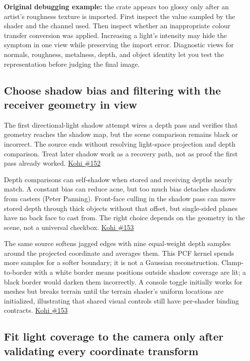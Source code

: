 \textbf{Original debugging example:} the crate appears too glossy only after an artist's roughness texture is imported. First inspect the value sampled by the shader and the channel used. Then inspect whether an inappropriate colour transfer conversion was applied. Increasing a light's intensity may hide the symptom in one view while preserving the import error. Diagnostic views for normals, roughness, metalness, depth, and object identity let you test the representation before judging the final image.

\subsection{Choose shadow bias and filtering with the receiver geometry in view}\label{06-engine-ii-ch026-choose-shadow-bias-and-filtering-with-the-receiver-geometry-in-view}

The first directional-light shadow attempt wires a depth pass and verifies that geometry reaches the shadow map, but the scene comparison remains black or incorrect. The source ends without resolving light-space projection and depth comparison. Treat later shadow work as a recovery path, not as proof the first pass already worked. \href{https://www.youtube.com/watch?v=2IxH8C9OUzg}{Kohi \#152}

Depth comparisons can self-shadow when stored and receiving depths nearly match. A constant bias can reduce acne, but too much bias detaches shadows from casters (Peter Panning). Front-face culling in the shadow pass can move stored depth through thick objects without that offset, but single-sided planes have no back face to cast from. The right choice depends on the geometry in the scene, not a universal checkbox. \href{https://www.youtube.com/watch?v=32RYiLA3OBs}{Kohi \#153}

The same source softens jagged edges with nine equal-weight depth samples around the projected coordinate and averages them. This PCF kernel spends more samples for a softer boundary; it is not a Gaussian reconstruction. Clamp-to-border with a white border means positions outside shadow coverage are lit; a black border would darken them incorrectly. A console toggle initially works for meshes but breaks terrain until the terrain shader's uniform locations are initialized, illustrating that shared visual controls still have per-shader binding contracts. \href{https://www.youtube.com/watch?v=32RYiLA3OBs}{Kohi \#153}

\subsection{Fit light coverage to the camera only after validating every coordinate transform}\label{06-engine-ii-ch026-fit-light-coverage-to-the-camera-only-after-validating-every-coordinate-transform}

